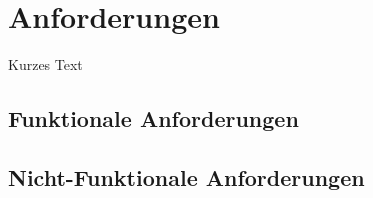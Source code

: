 \chapter{Anforderungen}
\label{cha:anforderungen}
Kurzes Text

\section{Funktionale Anforderungen}
\label{sec:grundlagen:funktionaleAnforderungen}

\section{Nicht-Funktionale Anforderungen}
\label{sec:grundlagen:nichtFunktionaleAnforderungen}